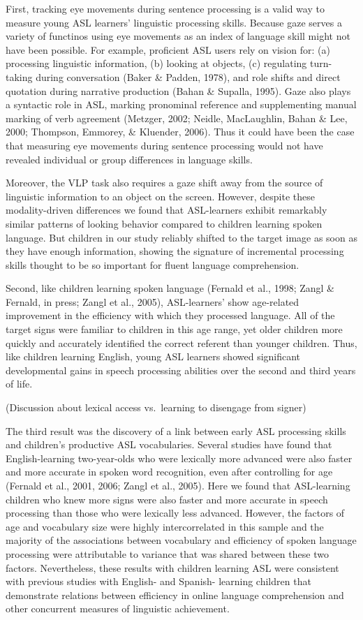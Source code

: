 \documentclass[12pt,]{article}
\begin{document}
First, tracking eye movements during sentence processing is a valid way
to measure young ASL learners' linguistic processing skills. Because
gaze serves a variety of functinos using eye movements as an index of
language skill might not have been possible. For example, proficient ASL
users rely on vision for: (a) processing linguistic information, (b)
looking at objects, (c) regulating turn-taking during conversation
(Baker \& Padden, 1978), and role shifts and direct quotation during
narrative production (Bahan \& Supalla, 1995). Gaze also plays a
syntactic role in ASL, marking pronominal reference and supplementing
manual marking of verb agreement (Metzger, 2002; Neidle, MacLaughlin,
Bahan \& Lee, 2000; Thompson, Emmorey, \& Kluender, 2006). Thus it could
have been the case that measuring eye movements during sentence
processing would not have revealed individual or group differences in
language skills.

Moreover, the VLP task also requires a gaze shift away from the source
of linguistic information to an object on the screen. However, despite
these modality-driven differences we found that ASL-learners exhibit
remarkably similar patterns of looking behavior compared to children
learning spoken language. But children in our study reliably shifted to
the target image as soon as they have enough information, showing the
signature of incremental processing skills thought to be so important
for fluent language comprehension.

Second, like children learning spoken language (Fernald et al., 1998;
Zangl \& Fernald, in press; Zangl et al., 2005), ASL-learners' show
age-related improvement in the efficiency with which they processed
language. All of the target signs were familiar to children in this age
range, yet older children more quickly and accurately identified the
correct referent than younger children. Thus, like children learning
English, young ASL learners showed significant developmental gains in
speech processing abilities over the second and third years of life.

(Discussion about lexical access vs.~learning to disengage from signer)

The third result was the discovery of a link between early ASL
processing skills and children's productive ASL vocabularies. Several
studies have found that English-learning two-year-olds who were
lexically more advanced were also faster and more accurate in spoken
word recognition, even after controlling for age (Fernald et al., 2001,
2006; Zangl et al., 2005). Here we found that ASL-learning children who
knew more signs were also faster and more accurate in speech processing
than those who were lexically less advanced. However, the factors of age
and vocabulary size were highly intercorrelated in this sample and the
majority of the associations between vocabulary and efficiency of spoken
language processing were attributable to variance that was shared
between these two factors. Nevertheless, these results with children
learning ASL were consistent with previous studies with English- and
Spanish- learning children that demonstrate relations between efficiency
in online language comprehension and other concurrent measures of
linguistic achievement.
\end{document}
